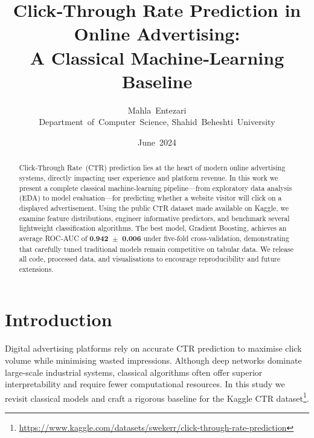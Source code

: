 \documentclass[12pt]{article}
\title{\textbf{Click‑Through Rate Prediction in Online Advertising:\\A Classical Machine‑Learning Baseline}}
\author{Mahla Entezari\\\small Department of Computer Science, Shahid Beheshti University}
\date{June 2024}
\begin{document}
\maketitle
\thispagestyle{empty}
\vspace{-1.5em}

\begin{abstract}
Click‑Through Rate (CTR) prediction lies at the heart of modern online advertising systems, directly impacting user experience and platform revenue. In this work we present a complete classical machine‑learning pipeline---from exploratory data analysis (EDA) to model evaluation---for predicting whether a website visitor will click on a displayed advertisement. Using the public CTR dataset made available on Kaggle, we examine feature distributions, engineer informative predictors, and benchmark several lightweight classification algorithms. The best model, Gradient Boosting, achieves an average ROC‑AUC of \textbf{0.942 $\pm$ 0.006} under five‑fold cross‑validation, demonstrating that carefully tuned traditional models remain competitive on tabular data. We release all code, processed data, and visualisations to encourage reproducibility and future extensions.
\end{abstract}
\newpage
\setcounter{page}{1}

{\hypersetup{linkcolor=black}\tableofcontents}
\newpage

\section{Introduction}\label{sec:intro}
Digital advertising platforms rely on accurate CTR prediction to maximise click volume while minimising wasted impressions. Although deep networks dominate large‑scale industrial systems, classical algorithms often offer superior interpretability and require fewer computational resources\cite{mcmahan2013ad,predict2019}. In this study we revisit classical models and craft a rigorous baseline for the Kaggle CTR dataset\footnote{\url{https://www.kaggle.com/datasets/swekerr/click-through-rate-prediction}}.
\end{document}
